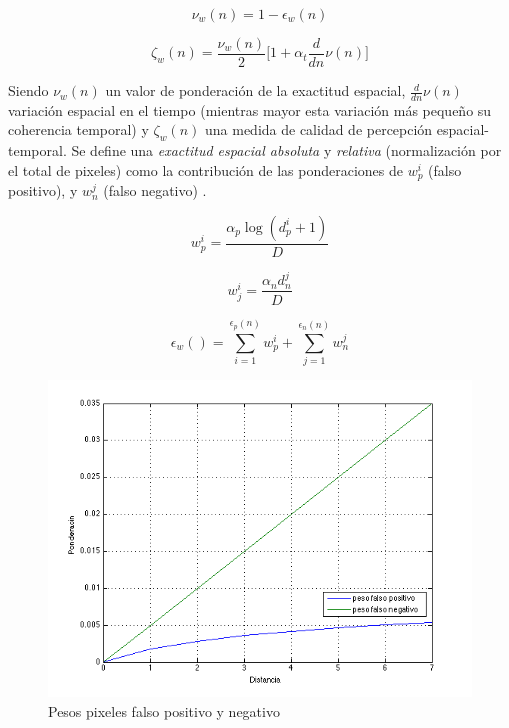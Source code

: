 \begin{equation}
\nu_w(n) = 1 - \epsilon_w(n)
\end{equation}

\begin{equation}
\zeta_w(n) = \frac{\nu_w(n)}{2} \lbrack 1 + \alpha_t \frac{d}{dn}\nu(n) \rbrack
\end{equation}

Siendo $\nu_w(n)$ un valor de ponderación de la exactitud espacial, $\frac{d}{dn}\nu(n)$ variación espacial en el tiempo (mientras mayor esta variación más pequeño su coherencia temporal) y $\zeta_w(n)$ una medida de calidad de percepción espacial-temporal. Se define una \emph{exactitud espacial absoluta} y \emph{relativa} (normalización por el total de pixeles) como la contribución de las ponderaciones de $w^i_p$ (falso positivo), y $w^j_n$ (falso negativo) . 

\begin{equation}
w^i_p = \frac{\alpha_p \log(d^i_p + 1)}{D}
\end{equation}

\begin{equation}
w^i_j = \frac{\alpha_nd^j_n}{D}
\end{equation}

\begin{equation}
\epsilon_w() = \sum_{i=1}^{\epsilon_p(n)}w^i_p +	 \sum_{j=1}^{\epsilon_n(n)} w^j_n
\end{equation}


\begin{figure}[!ht]
\centering
\includegraphics[scale=0.4]{img/PesosFalsoPositivoNegativo}
\caption{Pesos pixeles falso positivo y negativo}
\label{fig:Contexto espacial pesos para pixeles falso positivo y negativo}
\end{figure}

